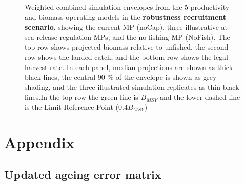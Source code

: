 \documentclass[11pt]{book}
\begin{document}
\begin{landscape}
\begin{figure}[htb]
{\centering {} 

}

\caption{Weighted combined simulation envelopes from the 5 productivity and biomass operating models in the \textbf{robustness recruitment scenario}, showing the current MP (noCap), three illustrative at-sea-release regulation MPs, and the no fishing MP (NoFish). The top row shows projected biomass relative to unfished, the second row shows the landed catch, and the bottom row shows the legal harvest rate. In each panel, median projections are shown as thick black lines, the central 90 \% of the envelope is shown as grey shading, and the three illustrated simulation replicates as thin black lines.In the top row the green line is $B_{MSY}$ and the lower dashed line is the Limit Reference Point (0.4$B_{MSY}$)}\label{fig:unnamed-chunk-26}
\end{figure}
\end{landscape}
\hypertarget{appendix}{%
\section{\texorpdfstring{Appendix\label{sec:app-minor}}{Appendix}}\label{appendix}}

\hypertarget{updated-ageing-error-matrix}{%
\subsection{Updated ageing error matrix}\label{updated-ageing-error-matrix}}
\end{document}
